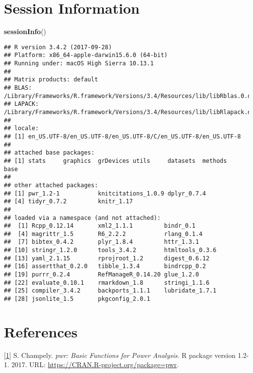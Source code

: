 \documentclass[]{article}
\newenvironment{Shaded}{\begin{snugshade}}{\end{snugshade}}
\newcommand{\KeywordTok}[1]{\textcolor[rgb]{0.13,0.29,0.53}{\textbf{{#1}}}}
\newcommand{\NormalTok}[1]{{#1}}
\begin{document}
\section{Session Information}\label{session-information}

\begin{Shaded}
\begin{Highlighting}[]
\KeywordTok{sessionInfo}\NormalTok{()}
\end{Highlighting}
\end{Shaded}

\begin{verbatim}
## R version 3.4.2 (2017-09-28)
## Platform: x86_64-apple-darwin15.6.0 (64-bit)
## Running under: macOS High Sierra 10.13.1
## 
## Matrix products: default
## BLAS: /Library/Frameworks/R.framework/Versions/3.4/Resources/lib/libRblas.0.dylib
## LAPACK: /Library/Frameworks/R.framework/Versions/3.4/Resources/lib/libRlapack.dylib
## 
## locale:
## [1] en_US.UTF-8/en_US.UTF-8/en_US.UTF-8/C/en_US.UTF-8/en_US.UTF-8
## 
## attached base packages:
## [1] stats     graphics  grDevices utils     datasets  methods   base     
## 
## other attached packages:
## [1] pwr_1.2-1           knitcitations_1.0.9 dplyr_0.7.4        
## [4] tidyr_0.7.2         knitr_1.17         
## 
## loaded via a namespace (and not attached):
##  [1] Rcpp_0.12.14       xml2_1.1.1         bindr_0.1         
##  [4] magrittr_1.5       R6_2.2.2           rlang_0.1.4       
##  [7] bibtex_0.4.2       plyr_1.8.4         httr_1.3.1        
## [10] stringr_1.2.0      tools_3.4.2        htmltools_0.3.6   
## [13] yaml_2.1.15        rprojroot_1.2      digest_0.6.12     
## [16] assertthat_0.2.0   tibble_1.3.4       bindrcpp_0.2      
## [19] purrr_0.2.4        RefManageR_0.14.20 glue_1.2.0        
## [22] evaluate_0.10.1    rmarkdown_1.8      stringi_1.1.6     
## [25] compiler_3.4.2     backports_1.1.1    lubridate_1.7.1   
## [28] jsonlite_1.5       pkgconfig_2.0.1
\end{verbatim}

\section{References}\label{references}

\protect\hyperlink{cite-pwr}{{[}1{]}} S. Champely. \emph{pwr: Basic
Functions for Power Analysis}. R package version 1.2-1. 2017. URL:
\url{https://CRAN.R-project.org/package=pwr}.
\end{document}
